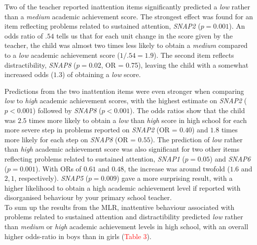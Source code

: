 \documentclass[10pt,letterpaper]{article}
\begin{document}
{{Two of the teacher reported inattention items significantly predicted a {\it low} rather than a {\it medium} academic achievement score. The strongest effect was found for an item reflecting problems related to sustained attention, {\it SNAP2} ($p = 0.001$). An odds ratio of $.54$ tells us that for each unit change in the score given by the teacher, the child was almost two times less likely to obtain a {\it medium} compared to a {\it low} academic achievement score ($1/.54 = 1.9$). The second item reflects distractibility, {\it SNAP8} ($p = 0.02$, OR = 0.75), leaving the child with a somewhat increased odds ($1.3$) of obtaining a {\it low} score.  


Predictions from the two inattention items were even stronger when comparing {\it low} to {\it high} academic achievement scores, with the highest estimate on {\it SNAP2} ($p < 0.001$) 
followed by {\it SNAP8} ($p < 0.001$).  The odds ratios show that the child was $2.5$ times more likely to obtain a {\it low} than {\it high} score in high school for each more severe step in problems reported on {\it SNAP2} (OR = $0.40$) and  $1.8$ times more likely for each step on {\it SNAP8} (OR = $0.55$).  
The prediction of {\it low} rather than {\it high} academic achievement score was also significant for two other items reflecting problems related to sustained attention, {\it SNAP1} ($p = 0.05$) and {\it SNAP6} ($p = 0.001$). { With ORs of $0.61$ and $0.48$, the increase was around twofold ($1.6$ and $2,1$, respectively). \it SNAP5} ($p = 0.009$) gave a more surprising result, with a higher likelihood to obtain a high academic achievement level if reported with disorganised behaviour by your primary school teacher.\\

To sum up the results from the MLR, inattentive behaviour associated with problems related to sustained attention and distractibility predicted {\it low} rather than {\it medium}
or {\it high} academic achievement levels in high school, with an overall higher odds-ratio in boys than in girls (\textcolor{red}{Table 3}). \\



  

\vspace{5mm}

}}
\end{document}
